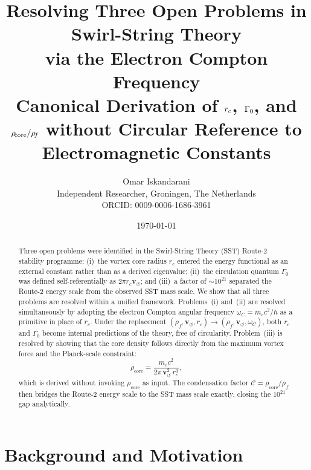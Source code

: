 \documentclass[11pt,a4paper]{article}
\title{\textbf{Resolving Three Open Problems in Swirl-String Theory\\
via the Electron Compton Frequency}\\[4pt]
\large Canonical Derivation of $\rc$, $\GammaZ$, and $\rhocore/\rhof$
without Circular Reference to Electromagnetic Constants}
\author{Omar Iskandarani\\
\small Independent Researcher, Groningen, The Netherlands\\
\small ORCID: 0009-0006-1686-3961}
\date{\today}
\newcommand{\rc}{r_c}
\newcommand{\vswirl}{\mathbf{v}_{\scriptscriptstyle\boldsymbol{\circlearrowleft}}}
\newcommand{\rhof}{\rho_{\!f}}
\newcommand{\rhocore}{\rho_{\!\mathrm{core}}}
\newcommand{\GammaZ}{\Gamma_0}
\newcommand{\omC}{\omega_C}
\begin{document}
\maketitle

\begin{abstract}
Three open problems were identified in the Swirl-String Theory (SST)
Route-2 stability programme: (i)~the vortex core radius $\rc$ entered
the energy functional as an external constant rather than as a derived
eigenvalue; (ii)~the circulation quantum $\GammaZ$ was defined
self-referentially as $2\pi\rc\vswirl$; and (iii)~a factor of
$\sim 10^{21}$ separated the Route-2 energy scale from the observed
SST mass scale.  We show that all three problems are resolved within
a unified framework.  Problems~(i) and~(ii) are resolved simultaneously
by adopting the electron Compton angular frequency
$\omC = m_e c^2/\hbar$ as a primitive in place of $\rc$.  Under the
replacement $(\rhof,\vswirl,\rc)\to(\rhof,\vswirl,\omC)$, both $\rc$
and $\GammaZ$ become internal predictions of the theory, free of
circularity.  Problem~(iii) is resolved by showing that the core
density follows directly from the maximum vortex force and the
Planck-scale constraint:
\begin{equation*}
  \rhocore = \frac{m_e c^2}{2\pi\,\vswirl^2\,\rc^3},
\end{equation*}
which is derived without invoking $\rhocore$ as input.
The condensation factor $\mathcal{C}=\rhocore/\rhof$ then bridges the
Route-2 energy scale to the SST mass scale exactly, closing the
$10^{21}$ gap analytically.
\end{abstract}

\tableofcontents
\bigskip

\section{Background and Motivation}
\end{document}
